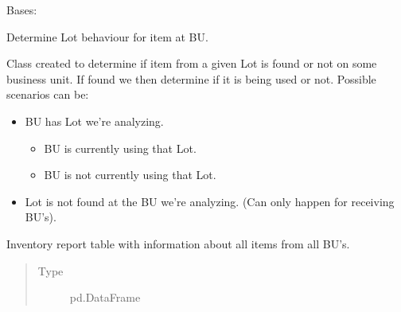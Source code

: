 \documentclass[letterpaper,10pt,english]{sphinxmanual}
\begin{document}
\begin{fulllineitems}
\label{\detokenize{source/optimization.datatools:optimization.datatools.extra_output.FindLot}}
Bases: 

Determine Lot behaviour for item at BU.

Class created to determine if item from a given Lot is found or not
on some business unit. If found we then determine if it is being used
or not. Possible scenarios can be:
\begin{itemize}
\item {} 
 BU has Lot we’re analyzing.
\begin{itemize}
\item {} 
 BU is currently using that Lot.

\item {} 
 BU is not currently using that Lot.

\end{itemize}

\item {} 
 Lot is not found at the BU we’re analyzing. (Can only happen for receiving BU’s).

\end{itemize}

\begin{fulllineitems}
\label{\detokenize{source/optimization.datatools:optimization.datatools.extra_output.FindLot.inventory_report}}
Inventory report table with information about all items from all BU’s.
\begin{quote}\begin{description}
\item[{Type}] \leavevmode
pd.DataFrame


\end{description}
\end{quote}
\end{fulllineitems}
\end{fulllineitems}
\end{document}
